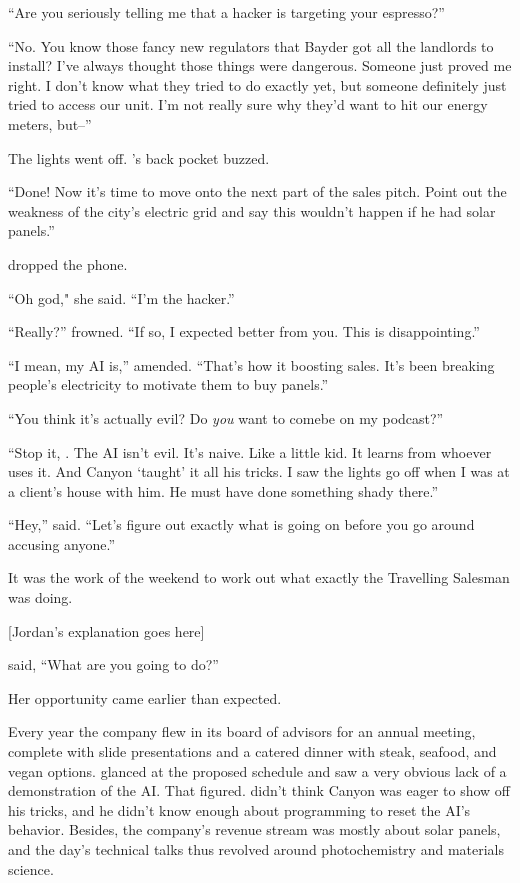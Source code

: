 ``Are you seriously telling me that a hacker is targeting your espresso?''

``No. You know those fancy new regulators that Bayder got all the landlords to install? I’ve always thought those things were dangerous. Someone just proved me right. I don’t know what they tried to do exactly yet, but someone definitely just tried to access our unit. I’m not really sure why they’d want to hit our energy meters, but--''

The lights went off. {\protag}'s back pocket buzzed.

``Done! Now it's time to move onto the next part of the sales pitch. Point out the weakness of the city’s electric grid and say this wouldn't happen if he had solar panels.''

{\protag} dropped the phone.

``Oh god," she said. ``I’m the hacker.''

``Really?'' {\sidetag} frowned. ``If so, I expected better from you. This is disappointing.''

``I mean, my AI is,'' {\protag} amended. ``That’s how it boosting sales. It's been breaking people’s electricity to motivate them to buy panels.''

``You think it’s actually evil? Do \emph{you} want to comebe on my podcast?''

``Stop it, {\sidetag}. The AI isn't evil. It's naive. Like a little kid. It learns from whoever uses it. And Canyon `taught' it all his tricks. I saw the lights go off when I was at a client’s house with him. He must have done something shady there.''

``Hey,” {\sidetag} said. ``Let’s figure out exactly what is going on before you go around accusing anyone.''

It was the work of the weekend to work out what exactly the Travelling Salesman was doing.

[Jordan’s explanation goes here]

{\sidetag} said, ``What are you going to do?''

\vspace{5mm}

Her opportunity came earlier than expected.

Every year the company flew in its board of advisors for an annual meeting, complete with slide presentations and a catered dinner with steak, seafood, and vegan options. {\protag} glanced at the proposed schedule and saw a very obvious lack of a demonstration of the AI. That figured. {\protag} didn't think Canyon was eager to show off his tricks, and he didn't know enough about programming to reset the AI's behavior. Besides, the company's revenue stream was mostly about solar panels, and the day's technical talks thus revolved around photochemistry and materials science.

